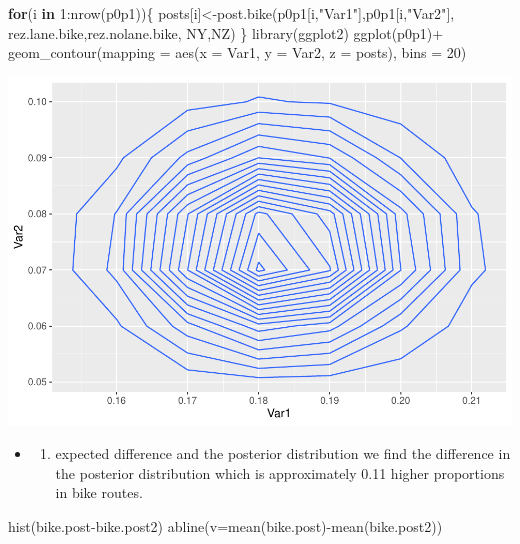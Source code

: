 \documentclass[
]{book}
\newenvironment{Shaded}{\begin{snugshade}}{\end{snugshade}}
\newcommand{\AttributeTok}[1]{\textcolor[rgb]{0.77,0.63,0.00}{#1}}
\newcommand{\ControlFlowTok}[1]{\textcolor[rgb]{0.13,0.29,0.53}{\textbf{#1}}}
\newcommand{\DecValTok}[1]{\textcolor[rgb]{0.00,0.00,0.81}{#1}}
\newcommand{\FunctionTok}[1]{\textcolor[rgb]{0.00,0.00,0.00}{#1}}
\newcommand{\NormalTok}[1]{#1}
\newcommand{\OtherTok}[1]{\textcolor[rgb]{0.56,0.35,0.01}{#1}}
\newcommand{\SpecialCharTok}[1]{\textcolor[rgb]{0.00,0.00,0.00}{#1}}
\newcommand{\StringTok}[1]{\textcolor[rgb]{0.31,0.60,0.02}{#1}}
\providecommand{\tightlist}{%
  \setlength{\itemsep}{0pt}\setlength{\parskip}{0pt}}
\theoremstyle{definition}
\theoremstyle{definition}
\theoremstyle{definition}
\theoremstyle{definition}
\theoremstyle{remark}
\begin{document}
\begin{Shaded}
\begin{Highlighting}[]
\ControlFlowTok{for}\NormalTok{(i }\ControlFlowTok{in} \DecValTok{1}\SpecialCharTok{:}\FunctionTok{nrow}\NormalTok{(p0p1))\{}
\NormalTok{  posts[i]}\OtherTok{\textless{}{-}}\FunctionTok{post.bike}\NormalTok{(p0p1[i,}\StringTok{"Var1"}\NormalTok{],p0p1[i,}\StringTok{"Var2"}\NormalTok{], rez.lane.bike,rez.nolane.bike, NY,NZ) }
\NormalTok{\}}
 \FunctionTok{library}\NormalTok{(ggplot2)}
 \FunctionTok{ggplot}\NormalTok{(p0p1)}\SpecialCharTok{+}
 \FunctionTok{geom\_contour}\NormalTok{(}\AttributeTok{mapping =} \FunctionTok{aes}\NormalTok{(}\AttributeTok{x =}\NormalTok{ Var1, }\AttributeTok{y =}\NormalTok{ Var2, }\AttributeTok{z =}\NormalTok{ posts), }\AttributeTok{bins =} \DecValTok{20}\NormalTok{)}
\end{Highlighting}
\end{Shaded}

\includegraphics{_main_files/figure-latex/unnamed-chunk-47-1.pdf}

\begin{itemize}
\item
  \begin{enumerate}
  \def\labelenumi{(\alph{enumi})}
  \setcounter{enumi}{3}
  \tightlist
  \item
    expected difference and the posterior distribution
    we find the difference in the posterior distribution which is approximately 0.11 higher proportions in bike routes.
  \end{enumerate}
\end{itemize}

\begin{Shaded}
\begin{Highlighting}[]
 \FunctionTok{hist}\NormalTok{(bike.post}\SpecialCharTok{{-}}\NormalTok{bike.post2)}
 \FunctionTok{abline}\NormalTok{(}\AttributeTok{v=}\FunctionTok{mean}\NormalTok{(bike.post)}\SpecialCharTok{{-}}\FunctionTok{mean}\NormalTok{(bike.post2))}
\end{Highlighting}
\end{Shaded}
\end{document}
